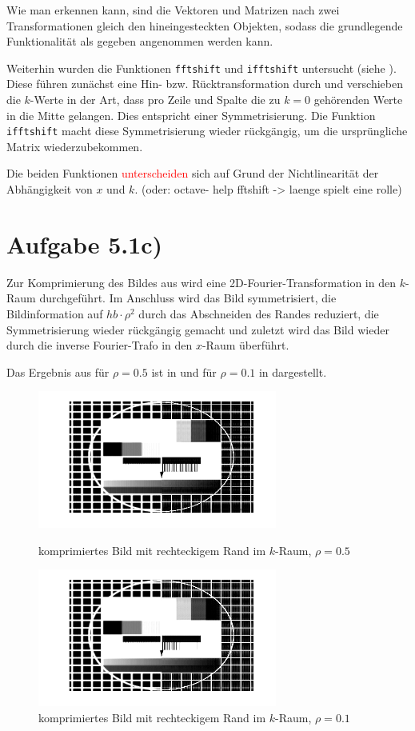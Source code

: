 Wie man erkennen kann, sind die Vektoren und Matrizen nach zwei Transformationen
gleich den hineingesteckten Objekten, sodass die grundlegende Funktionalität als
gegeben angenommen werden kann.

Weiterhin wurden die Funktionen \texttt{fftshift} und \texttt{ifftshift}
untersucht (siehe ). Diese führen zunächst eine Hin- bzw. Rücktransformation
durch und verschieben die $k$-Werte in der Art, dass pro Zeile und Spalte die 
zu $k=0$ gehörenden Werte in die Mitte gelangen. Dies entspricht einer Symmetrisierung.
Die Funktion \texttt{ifftshift} macht diese Symmetrisierung wieder rückgängig, um
die ursprüngliche Matrix wiederzubekommen.

Die beiden Funktionen \textcolor{red}{unterscheiden} sich auf Grund der Nichtlinearität der Abhängigkeit
von $x$ und $k$. (oder: octave- help fftshift -> laenge spielt eine rolle)


\section*{Aufgabe 5.1c)}
Zur Komprimierung des Bildes aus  wird eine 2D-Fourier-Transformation
in den $k$-Raum durchgeführt. Im Anschluss wird das Bild symmetrisiert, die Bildinformation
auf $hb\cdot ρ^2$ durch das Abschneiden des Randes reduziert, die Symmetrisierung wieder
rückgängig gemacht und zuletzt wird das Bild wieder durch die inverse Fourier-Trafo in den
$x$-Raum überführt.

Das Ergebnis aus  für $ρ=0.5$ ist in  und für $ρ=0.1$ in  dargestellt.


\begin{figure}[htb]
\centering
  \includegraphics[width=0.7\textwidth,keepaspectratio]{../tmp/eins_c_0_5}
  \caption{komprimiertes Bild mit rechteckigem Rand im $k$-Raum, $ρ=0.5$}
  \label{fig:1c5}
  \includegraphics[width=0.7\textwidth,keepaspectratio]{../tmp/eins_c_0_1}
  \caption{komprimiertes Bild mit rechteckigem Rand im $k$-Raum, $ρ=0.1$}
  \label{fig:1c1}
\end{figure}


